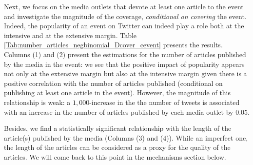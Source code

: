 Next, we focus on the media outlets that devote at least one article to the event and investigate the magnitude of the coverage, \textit{conditional on covering} the event. Indeed, the popularity of an event on Twitter can indeed play a role both at the intensive and at the extensive margin. Table \ref{Tab:number_articles_negbinomial_Dcover_cevent} presents the results. Columns (1) and (2) present the estimations for the number of articles published by the media in the event: we see that the positive impact of popularity appears not only at the extensive margin but also at the intensive margin given there is a positive correlation with the number of articles published (conditional on publishing at least one article in the event). However, the magnitude of this relationship is weak: a $1,000$-increase in the the number of tweets is associated with an increase in the number of articles published by each media outlet by $0.05$.

Besides, we find a statistically significant relationship with the length of the article(s) published by the media (Columns (3) and (4)). While an imperfect one, the length of the articles can be considered as a proxy for the quality of the articles. We will come back to this point in the mechanisms section below.


